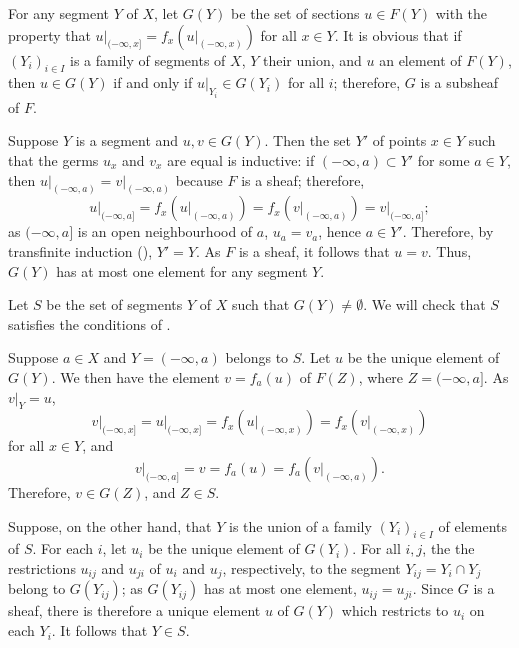 \documentclass{article}
\begin{document}
\begin{solution}[\ref{exe:x9ewqbv6}]
  \label{sol:l1p9lj7v}
  For any segment \(Y\) of \(X\), let \(G(Y)\) be the set of sections
  \(u \in F(Y)\) with the property that
  \(u \vert_{(-\infty, x]} = f_x(u \vert_{(-\infty, x)})\) for all
  \(x \in Y\).  It is obvious that if \((Y_i)_{i \in I}\) is a family
  of segments of \(X\), \(Y\) their union, and \(u\) an element of
  \(F(Y)\), then \(u \in G(Y)\) if and only if
  \(u \vert_{Y_i} \in G(Y_i)\) for all \(i\); therefore, \(G\) is a
  subsheaf of \(F\).

  Suppose \(Y\) is a segment and \(u,v \in G(Y)\).  Then the set
  \(Y'\) of points \(x \in Y\) such that the germs \(u_x\) and \(v_x\)
  are equal is inductive: if \((-\infty, a) \subset Y'\) for some
  \(a \in Y\), then
  \(u \vert_{(-\infty, a)} = v \vert_{(-\infty, a)}\) because \(F\) is
  a sheaf; therefore,
  \begin{displaymath}
    u \vert_{(-\infty, a]} = f_x(u \vert_{(-\infty, a)}) =
    f_x(v \vert_{(-\infty, a)}) = v \vert_{(-\infty, a]};
  \end{displaymath}
  as \((-\infty, a]\) is an open neighbourhood of \(a\),
  \(u_a = v_a\), hence \(a \in Y'\).  Therefore, by transfinite
  induction (), \(Y' = Y\).  As \(F\) is a sheaf,
  it follows that \(u = v\).  Thus, \(G(Y)\) has at most one element
  for any segment \(Y\).

  Let \(S\) be the set of segments \(Y\) of \(X\) such that
  \(G(Y) \neq \emptyset\).  We will check that \(S\) satisfies the
  conditions of .

  Suppose \(a \in X\) and \(Y = (-\infty, a)\) belongs to \(S\).  Let
  \(u\) be the unique element of \(G(Y)\).  We then have the element
  \(v = f_a(u)\) of \(F(Z)\), where \(Z = (-\infty, a]\).  As
  \(v \vert_Y = u\),
  \begin{displaymath}
    v \vert_{(-\infty, x]} = u \vert_{(-\infty, x]} =
    f_x(u \vert_{(-\infty, x)}) = f_x(v \vert_{(-\infty, x)})
  \end{displaymath}
  for all \(x \in Y\), and
  \begin{displaymath}
    v \vert_{(-\infty, a]} = v = f_a(u) = f_a(v \vert_{(-\infty, a)}).
  \end{displaymath}
  Therefore, \(v \in G(Z)\), and \(Z \in S\).

  Suppose, on the other hand, that \(Y\) is the union of a family
  \((Y_i)_{i \in I}\) of elements of \(S\).  For each \(i\), let
  \(u_i\) be the unique element of \(G(Y_i)\).  For all \(i,j\), the
  the restrictions \(u_{ij}\) and \(u_{ji}\) of \(u_i\) and \(u_j\),
  respectively, to the segment \(Y_{ij} = Y_i \cap Y_j\) belong to
  \(G(Y_{ij})\); as \(G(Y_{ij})\) has at most one element,
  \(u_{ij} = u_{ji}\).  Since \(G\) is a sheaf, there is therefore a
  unique element \(u\) of \(G(Y)\) which restricts to \(u_i\) on each
  \(Y_i\).  It follows that \(Y \in S\).


\end{solution}
\end{document}
